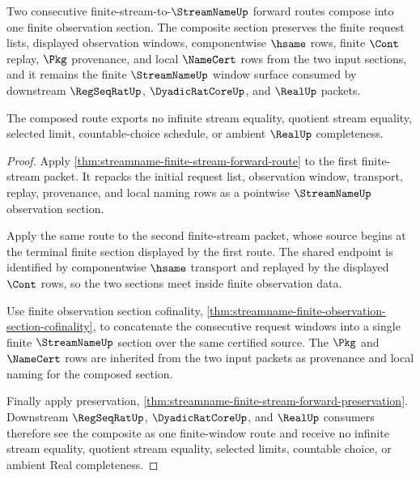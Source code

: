 \begin{theorem}
\label{thm:streamname-finite-stream-forward-composition}
Two consecutive finite-stream-to-$\StreamNameUp$ forward routes compose into one finite observation section. The composite section preserves the finite request lists, displayed observation windows, componentwise $\hsame$ rows, finite $\Cont$ replay, $\Pkg$ provenance, and local $\NameCert$ rows from the two input sections, and it remains the finite $\StreamNameUp$ window surface consumed by downstream $\RegSeqRatUp$, $\DyadicRatCoreUp$, and $\RealUp$ packets.

The composed route exports no infinite stream equality, quotient stream equality, selected limit, countable-choice schedule, or ambient $\RealUp$ completeness.
\end{theorem}
\begin{proof}
Apply \autoref{thm:streamname-finite-stream-forward-route} to the first finite-stream packet. It repacks the initial request list, observation window, transport, replay, provenance, and local naming rows as a pointwise $\StreamNameUp$ observation section.

Apply the same route to the second finite-stream packet, whose source begins at the terminal finite section displayed by the first route. The shared endpoint is identified by componentwise $\hsame$ transport and replayed by the displayed $\Cont$ rows, so the two sections meet inside finite observation data.

Use finite observation section cofinality, \autoref{thm:streamname-finite-observation-section-cofinality}, to concatenate the consecutive request windows into a single finite $\StreamNameUp$ section over the same certified source. The $\Pkg$ and $\NameCert$ rows are inherited from the two input packets as provenance and local naming for the composed section.

Finally apply preservation, \autoref{thm:streamname-finite-stream-forward-preservation}. Downstream $\RegSeqRatUp$, $\DyadicRatCoreUp$, and $\RealUp$ consumers therefore see the composite as one finite-window route and receive no infinite stream equality, quotient stream equality, selected limits, countable choice, or ambient Real completeness.
\end{proof}
